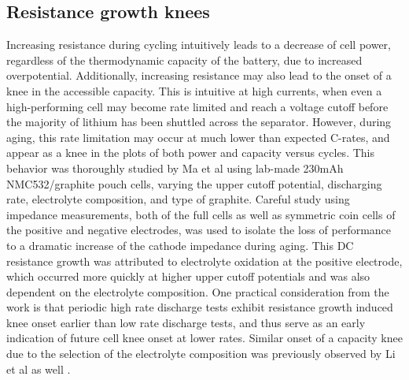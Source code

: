 \documentclass[journal=jpcl, manuscript=article, layout=onecolumn]{achemso}
\begin{document}
\subsection{Resistance growth knees}

Increasing resistance during cycling intuitively leads to a decrease of cell power, regardless of the thermodynamic capacity of the battery, due to increased overpotential. Additionally, increasing resistance may also lead to the onset of a knee in the accessible capacity. This is intuitive at high currents, when even a high-performing cell may become rate limited and reach a voltage cutoff before the majority of lithium has been shuttled across the separator. However, during aging, this rate limitation may occur at much lower than expected C-rates, and appear as a knee in the plots of both power and capacity versus cycles. This behavior was thoroughly studied by Ma et al \cite{ma_editors_2019} using lab-made 230mAh NMC532/graphite pouch cells, varying the upper cutoff potential, discharging rate, electrolyte composition, and type of graphite. Careful study using impedance measurements, both of the full cells as well as symmetric coin cells of the positive and negative electrodes, was used to isolate the loss of performance to a dramatic increase of the cathode impedance during aging. This DC resistance growth was attributed to electrolyte oxidation at the positive electrode, which occurred more quickly at higher upper cutoff potentials and was also dependent on the electrolyte composition. One practical consideration from the work is that periodic high rate discharge tests exhibit resistance growth induced knee onset earlier than low rate discharge tests, and thus serve as an early indication of future cell knee onset at lower rates. Similar onset of a capacity knee due to the selection of the electrolyte composition was previously observed by Li et al as well \cite{li_methyl_2018}. 
\end{document}

